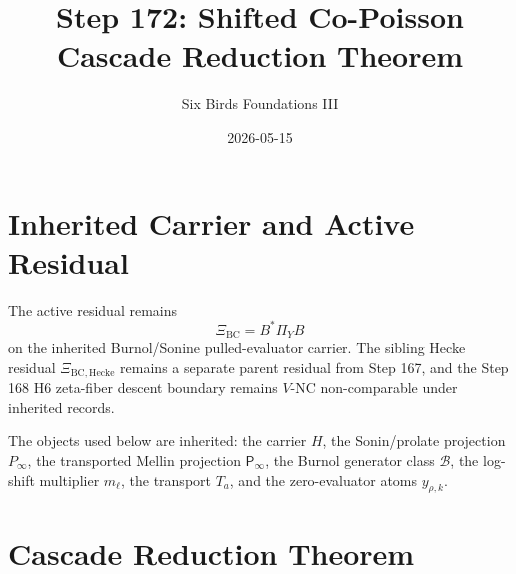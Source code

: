 \documentclass[11pt]{article}
\title{Step 172: Shifted Co-Poisson Cascade Reduction Theorem}
\author{Six Birds Foundations III}
\date{2026-05-15}
\newcommand{\XiBC}{\Xi_{\mathrm{BC}}}
\newcommand{\XiHecke}{\Xi_{\mathrm{BC,Hecke}}}
\newcommand{\Psym}{\mathsf P_\infty}
\newcommand{\Pinf}{P_\infty}
\newcommand{\Blegal}{\mathcal B}
\begin{document}
\maketitle

\section{Inherited Carrier and Active Residual}

The active residual remains
\[
  \XiBC=B^*\Pi_YB
\]
on the inherited Burnol/Sonine pulled-evaluator carrier.  The sibling Hecke
residual \(\XiHecke\) remains a separate parent residual from Step 167, and
the Step 168 H6 zeta-fiber descent boundary remains \(V\)-NC
non-comparable under inherited records.

The objects used below are inherited: the carrier \(H\), the Sonin/prolate
projection \(\Pinf\), the transported Mellin projection \(\Psym\), the
Burnol generator class \(\Blegal\), the log-shift multiplier \(m_\ell\), the
transport \(T_a\), and the zero-evaluator atoms \(y_{\rho,k}\).

\section{Cascade Reduction Theorem}
\end{document}
